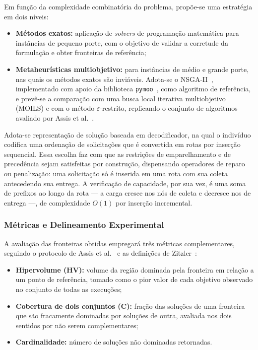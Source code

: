 \documentclass[12pt,a4paper]{article}
\theoremstyle{plain}
\begin{document}
Em função da complexidade combinatória do problema, propõe-se uma estratégia em dois níveis:

\begin{itemize}
    \item \textbf{Métodos exatos:} aplicação de \textit{solvers} de programação matemática para instâncias de pequeno porte, com o objetivo de validar a corretude da formulação e obter fronteiras de referência;
    \item \textbf{Metaheurísticas multiobjetivo:} para instâncias de médio e grande porte, nas quais os métodos exatos são inviáveis. Adota-se o NSGA-II~\cite{deb2002}, implementado com apoio da biblioteca \texttt{pymoo}~\cite{blank2020}, como algoritmo de referência, e prevê-se a comparação com uma busca local iterativa multiobjetivo (MOILS) e com o método $\varepsilon$-restrito, replicando o conjunto de algoritmos avaliado por Assis et al.~\cite{assis2013}.
\end{itemize}

Adota-se representação de solução baseada em decodificador, na qual o indivíduo codifica uma ordenação de solicitações que é convertida em rotas por inserção sequencial. Essa escolha faz com que as restrições de emparelhamento e de precedência sejam satisfeitas por construção, dispensando operadores de reparo ou penalização: uma solicitação só é inserida em uma rota com sua coleta antecedendo sua entrega. A verificação de capacidade, por sua vez, é uma soma de prefixos ao longo da rota --- a carga cresce nos nós de coleta e decresce nos de entrega ---, de complexidade $O(1)$ por inserção incremental.

\subsubsection{Métricas e Delineamento Experimental}

A avaliação das fronteiras obtidas empregará três métricas complementares, seguindo o protocolo de Assis et al.~\cite{assis2013} e as definições de Zitzler~\cite{zitzler1999}:

\begin{itemize}
    \item \textbf{Hipervolume (HV):} volume da região dominada pela fronteira em relação a um ponto de referência, tomado como o pior valor de cada objetivo observado no conjunto de todas as execuções;
    \item \textbf{Cobertura de dois conjuntos (C):} fração das soluções de uma fronteira que são fracamente dominadas por soluções de outra, avaliada nos dois sentidos por não serem complementares;
    \item \textbf{Cardinalidade:} número de soluções não dominadas retornadas.
\end{itemize}
\end{document}
